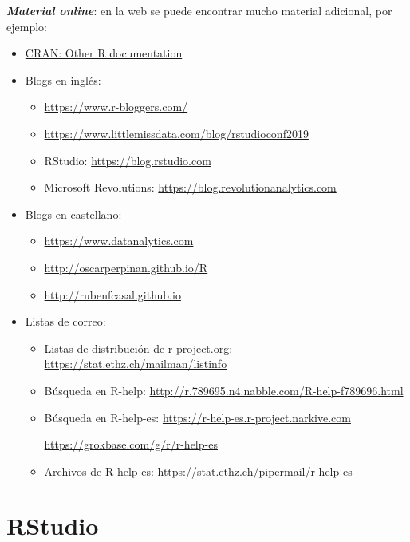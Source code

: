 \documentclass[]{book}
\begin{document}
\textbf{\emph{Material online}}:
en la web se puede encontrar mucho material adicional, por ejemplo:

\begin{itemize}
\item
  \href{https://www.r-project.org/other-docs.html}{CRAN: Other R documentation}
\item
  Blogs en inglés:

  \begin{itemize}
  \item
    \url{https://www.r-bloggers.com/}
  \item
    \url{https://www.littlemissdata.com/blog/rstudioconf2019}
  \item
    RStudio: \url{https://blog.rstudio.com}
  \item
    Microsoft Revolutions: \url{https://blog.revolutionanalytics.com}
  \end{itemize}
\item
  Blogs en castellano:

  \begin{itemize}
  \item
    \url{https://www.datanalytics.com}
  \item
    \url{http://oscarperpinan.github.io/R}
  \item
    \url{http://rubenfcasal.github.io}
  \end{itemize}
\item
  Listas de correo:

  \begin{itemize}
  \item
    Listas de distribución de r-project.org: \url{https://stat.ethz.ch/mailman/listinfo}
  \item
    Búsqueda en R-help: \url{http://r.789695.n4.nabble.com/R-help-f789696.html}
  \item
    Búsqueda en R-help-es: \url{https://r-help-es.r-project.narkive.com}

    \url{https://grokbase.com/g/r/r-help-es}
  \item
    Archivos de R-help-es: \url{https://stat.ethz.ch/pipermail/r-help-es}
  \end{itemize}
\end{itemize}

\hypertarget{rstudio-links}{%
\section{RStudio}\label{rstudio-links}}
\end{document}
